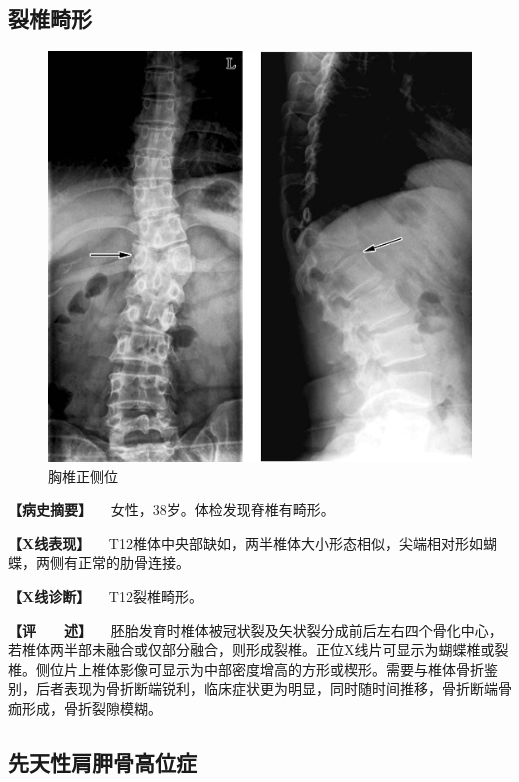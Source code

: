 \subsection{裂椎畸形}

\begin{figure}[!htbp]
 \centering
 \includegraphics{./images/Image00018.jpg}
 \captionsetup{justification=centering}
 \caption{胸椎正侧位}
 \label{fig2-2-2}
  \end{figure} 

\textbf{【病史摘要】} 　女性，38岁。体检发现脊椎有畸形。

\textbf{【X线表现】}
　T12椎体中央部缺如，两半椎体大小形态相似，尖端相对形如蝴蝶，两侧有正常的肋骨连接。

\textbf{【X线诊断】} 　T12裂椎畸形。

\textbf{【评　　述】}
　胚胎发育时椎体被冠状裂及矢状裂分成前后左右四个骨化中心，若椎体两半部未融合或仅部分融合，则形成裂椎。正位X线片可显示为蝴蝶椎或裂椎。侧位片上椎体影像可显示为中部密度增高的方形或楔形。需要与椎体骨折鉴别，后者表现为骨折断端锐利，临床症状更为明显，同时随时间推移，骨折断端骨痂形成，骨折裂隙模糊。

\subsection{先天性肩胛骨高位症}

